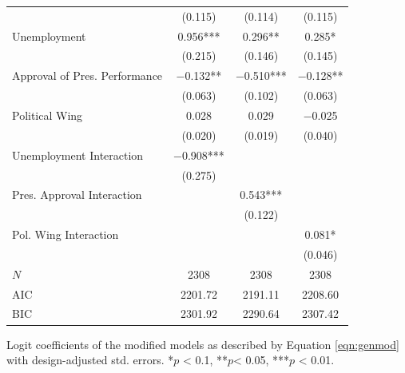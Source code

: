 \documentclass[12pt,a4]{article}\usepackage[]{graphicx}\usepackage[]{xcolor}
\begin{document}
\begin{table}[htbp]
\begin{center}
\begin{tabular}[t]{lccc}
 & (\num{0.115}) & (\num{0.114}) & (\num{0.115})\\
Unemployment & \num{0.956}*** & \num{0.296}** & \num{0.285}*\\
 & (\num{0.215}) & (\num{0.146}) & (\num{0.145})\\
Approval of Pres. Performance & \num{-0.132}** & \num{-0.510}*** & \num{-0.128}**\\
 & (\num{0.063}) & (\num{0.102}) & (\num{0.063})\\
Political Wing & \num{0.028} & \num{0.029} & \num{-0.025}\\
 & (\num{0.020}) & (\num{0.019}) & (\num{0.040})\\
Unemployment Interaction & \num{-0.908}*** &  & \\
 & (\num{0.275}) &  & \\
Pres. Approval Interaction &  & \num{0.543}*** & \\
 &  & (\num{0.122}) & \\
Pol. Wing Interaction &  &  & \num{0.081}*\\
 &  &  & (\num{0.046})\\
\midrule
$N$ & \num{2308} & \num{2308} & \num{2308}\\
AIC & \num{2201.72} & \num{2191.11} & \num{2208.60}\\
BIC & \num{2301.92} & \num{2290.64} & \num{2307.42}\\
\bottomrule
\end{tabular}


\end{center}
Logit coefficients of the modified models as described by Equation \ref{eqn:genmod} with design-adjusted std. errors. *$p$ < 0.1, **$p$< 0.05, ***$p$ < 0.01.
\end{table}
\end{document}

